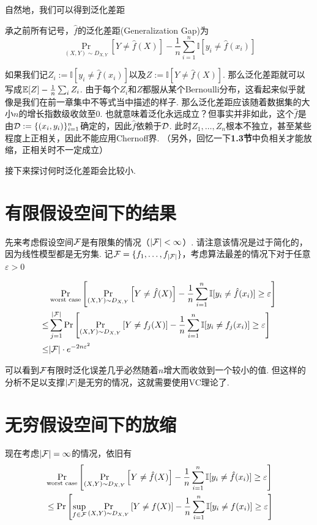 自然地，我们可以得到泛化差距
\begin{definition}
    承之前所有记号，$\hat f$的泛化差距(Generalization Gap)为 
    \[
    \Pr_{(X, Y) \sim D_{X,Y}}\left[
        Y \neq \hat f(X)
    \right] - \dfrac{1}{n} \sum_{i=1}^n \mathbb{I}[y_i \neq \hat f(x_i)]
    \]
\end{definition}

如果我们记$Z_i := \mathbb{I}[y_i \neq \hat f(x_i)]$以及$Z := \mathbb{I}[Y \neq \hat f(X)]$. 那么泛化差距就可以写成$\mathbb{E}[Z] - \frac{1}{n} \sum_i Z_i$. 由于每个$Z_i$和$Z$都服从某个Bernoulli分布，这看起来似乎就像是我们在前一章集中不等式当中描述的样子. 那么泛化差距应该随着数据集的大小$n$的增长指数级收敛至$0$. 也就意味着泛化永远成立？但事实并非如此，这个$\hat f$是由$\mathcal{D} := \{(x_i, y_i)\}_{i=1}^n$确定的，因此$\hat f$依赖于$\mathcal{D}$. 此时$Z_1, \dots, Z_n$根本不独立，甚至某些程度上正相关，因此不能应用Chernoff界. （另外，回忆一下\textbf{1.3节}中负相关才能放缩，正相关时不一定成立）

接下来探讨何时泛化差距会比较小. 

\section{有限假设空间下的结果}

先来考虑假设空间$\mathcal{F}$是有限集的情况（$|\mathcal{F}| < \infty$）. 请注意该情况是过于简化的，因为线性模型都是无穷集. 记$\mathcal{F} = \{f_1, \dots, f_{|\mathcal{F}|}\}$，考虑算法最差的情况下对于任意$\varepsilon > 0$

\begin{align*}
    & \Pr_{\text{worst case}} \left[
        \Pr_{(X, Y) \sim D_{X,Y}} \left[
            Y \neq \hat f (X)
        \right] - \dfrac{1}{n} \sum_{i=1}^n \mathbb{I}[y_i \neq \hat f(x_i)] \ge \varepsilon
    \right] \\
    \le & 
    \sum_{j=1}^{|\mathcal{F}|} \Pr\left[
        \Pr_{(X, Y) \sim D_{X,Y}} \left[
            Y \neq f_j (X)
        \right] - \dfrac{1}{n} \sum_{i=1}^n \mathbb{I}[y_i \neq f_j(x_i)] \ge \varepsilon
    \right] \\ 
    \le & |\mathcal{F}| \cdot e^{-2n\varepsilon^2}
\end{align*}

可以看到$\mathcal{F}$有限时泛化误差几乎必然随着$n$增大而收敛到一个较小的值. 但这样的分析不足以支撑$|\mathcal{F}|$是无穷的情况，这就需要使用VC理论了.

\section{无穷假设空间下的放缩}
现在考虑$|\mathcal{F}| = \infty$的情况，依旧有
\begin{align}
        & \Pr_{\text{worst case}} \left[
        \Pr_{(X, Y) \sim D_{X,Y}} \left[
            Y \neq \hat f (X)
        \right] - \dfrac{1}{n} \sum_{i=1}^n \mathbb{I}[y_i \neq \hat f(x_i)] \ge \varepsilon
    \right] \\ \label{eq:generalization-err-ineq}
    & \le \Pr\left[
        \sup_{f\in \mathcal{F}}\Pr_{(X, Y) \sim D_{X,Y}} \left[
            Y \neq f (X)
        \right] - \dfrac{1}{n} \sum_{i=1}^n \mathbb{I}[y_i \neq f(x_i)] \ge \varepsilon
    \right]
\end{align}

